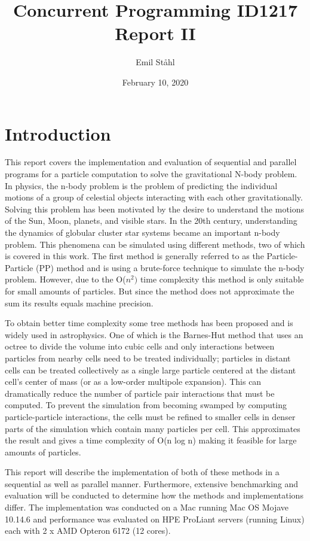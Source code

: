 \documentclass{article}
\title{\textbf{Concurrent Programming ID1217} \\ 
\textbf{Report II}}
\author{Emil Ståhl}
\date{February 10, 2020}
\begin{document}
\maketitle

\section{Introduction}

This report covers the implementation and evaluation of sequential and parallel programs for a particle computation to solve the gravitational N-body problem. In physics, the n-body problem is the problem of predicting the individual motions of a group of celestial objects interacting with each other gravitationally. Solving this problem has been motivated by the desire to understand the motions of the Sun, Moon, planets, and visible stars. In the 20th century, understanding the dynamics of globular cluster star systems became an important n-body problem. This phenomena can be simulated using different methods, two of which is covered in this work. The first method is generally referred to as the Particle-Particle (PP) method and is using a brute-force technique to simulate the n-body problem. However, due to the O(\(n^2)\) time complexity this method is only suitable for small amounts of particles. But since the method does not approximate the sum its results equals machine precision. 

To obtain better time complexity some tree methods has been proposed and is widely used in astrophysics. One of which is the Barnes-Hut method that uses an octree to divide the volume into cubic cells and only interactions between particles from nearby cells need to be treated individually; particles in distant cells can be treated collectively as a single large particle centered at the distant cell's center of mass (or as a low-order multipole expansion). This can dramatically reduce the number of particle pair interactions that must be computed. To prevent the simulation from becoming swamped by computing particle-particle interactions, the cells must be refined to smaller cells in denser parts of the simulation which contain many particles per cell. This approximates the result and gives a time complexity of O(n log n) making it feasible for large amounts of particles. 

This report will describe the implementation of both of these methods in a sequential as well as parallel manner. Furthermore, extensive benchmarking and evaluation will be conducted to determine how the methods and implementations differ. The implementation was conducted on a Mac running Mac OS Mojave 10.14.6 and performance was evaluated on HPE ProLiant servers (running Linux) each with 2 x AMD Opteron 6172 (12 cores).
\end{document}
